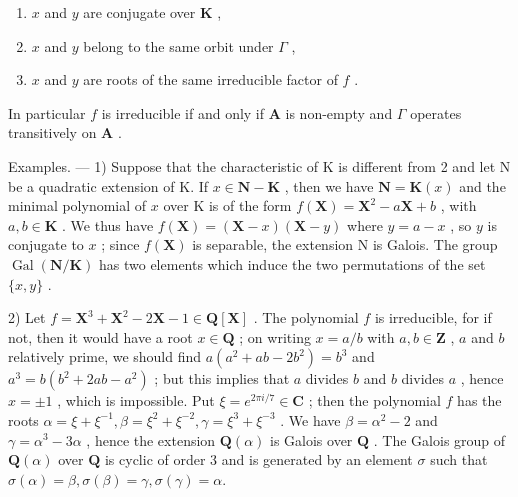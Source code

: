\begin{enumerate}
\def\labelenumi{\alph{enumi})}
\item
  \(x\) and \(y\) are conjugate over \(\mathbf{K}\) ,
\item
  \(x\) and \(y\) belong to the same orbit under \(\Gamma\) ,
\item
  \(x\) and \(y\) are roots of the same irreducible factor of \(f\) .
\end{enumerate}

In particular \(f\) is irreducible if and only if \(\mathbf{A}\) is non-empty and \(\Gamma\) operates transitively on \(\mathbf{A}\) .

Examples. --- 1) Suppose that the characteristic of K is different from 2 and let N be a quadratic extension of K. If \(x \in \mathbf{N} - \mathbf{K}\) , then we have \(\mathbf{N} = \mathbf{K}(x)\) and the minimal polynomial of \(x\) over K is of the form \(f(\mathbf{X}) = \mathbf{X}^2 - a\mathbf{X} + b\) , with \(a, b \in \mathbf{K}\) . We thus have \(f(\mathbf{X}) = (\mathbf{X} - x)(\mathbf{X} - y)\) where \(y = a - x\) , so \(y\) is conjugate to \(x\) ; since \(f(\mathbf{X})\) is separable, the extension N is Galois. The group \(\operatorname{Gal}(\mathbf{N}/\mathbf{K})\) has two elements which induce the two permutations of the set \(\{x, y\}\) .

2) Let \(f = \mathbf{X}^3 + \mathbf{X}^2 - 2\mathbf{X} - 1 \in \mathbf{Q}[\mathbf{X}]\) . The polynomial \(f\) is irreducible, for if not, then it would have a root \(x \in \mathbf{Q}\) ; on writing \(x = a / b\) with \(a, b \in \mathbf{Z}\) , \(a\) and \(b\) relatively prime, we should find \(a(a^2 + ab - 2b^2) = b^3\) and \(a^3 = b(b^2 + 2ab - a^2)\) ; but this implies that \(a\) divides \(b\) and \(b\) divides \(a\) , hence \(x = \pm 1\) , which is impossible. Put \(\xi = e^{2\pi i / 7} \in \mathbf{C}\) ; then the polynomial \(f\) has the roots \(\alpha = \xi + \xi^{-1}, \beta = \xi^2 + \xi^{-2}, \gamma = \xi^3 + \xi^{-3}\) . We have \(\beta = \alpha^2 - 2\) and \(\gamma = \alpha^3 - 3\alpha\) , hence the extension \(\mathbf{Q}(\alpha)\) is Galois over \(\mathbf{Q}\) . The Galois group of \(\mathbf{Q}(\alpha)\) over \(\mathbf{Q}\) is cyclic of order 3 and is generated by an element \(\sigma\) such that \(\sigma(\alpha) = \beta, \sigma(\beta) = \gamma, \sigma(\gamma) = \alpha.\)

